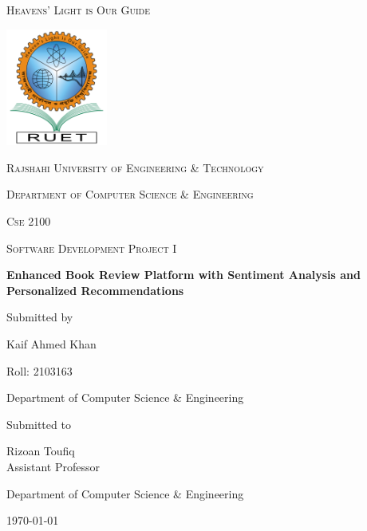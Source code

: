\documentclass[12pt,a4paper]{article}
\newcommand{\univ}{Rajshahi University of Engineering \& Technology}
\newcommand{\thedept}{Department of Computer Science \& Engineering}
\newcommand{\thecourse}{Software Development Project I}
\newcommand{\thetitle}{Enhanced Book Review Platform with Sentiment Analysis and Personalized Recommendations}
\newcommand{\theauthor}{Kaif Ahmed Khan}
\newcommand{\thesupervisor}{Rizoan Toufiq}
\newcommand{\asp}{Assistant Professor}
\newcommand{\thedesignation}{\asp}
\begin{document}
\begin{titlepage}
\centering
{\scshape Heavens' Light is Our Guide\par}\vspace{.25cm}
\includegraphics[width=0.25\textwidth]{logo.png}\par\vspace{1cm}
{\scshape\LARGE \univ\par}
\vspace{.5cm}
{\scshape\Large \thedept\par}
\vspace{1cm}
{\scshape\Large Cse 2100\par}
{\scshape\Large \thecourse\par}
\vspace{1cm}
{\Large\bfseries \thetitle\par}
\vspace{1cm}
Submitted by\par
{\large \theauthor\par}
{\large Roll: 2103163\par}
{\large \thedept\par}
\vfill
Submitted to\par
{\large \thesupervisor\\\thedesignation\par}
{\large \thedept\par}
\vfill
{\large \today\par}
\end{titlepage}
\tableofcontents
\newpage
\listoffigures

\end{document}
